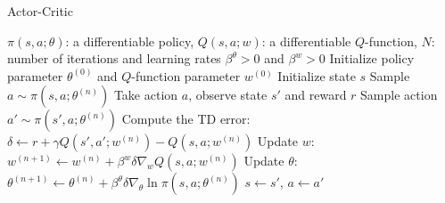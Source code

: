\begin{algorithm}[htb!]
\caption{Actor-Critic}
\label{Codes:ActorCritic}
\begin{algorithmic}
\REQUIRE $\pi(s, a; \theta)$: a differentiable policy, $Q(s, a; w)$: a differentiable $Q$-function, $N$: number of iterations and learning rates $\beta^\theta > 0$ and $\beta^w > 0$
\STATE Initialize policy parameter $\theta^{(0)}$ and $Q$-function parameter $w^{(0)}$
\STATE Initialize state $s$
    \STATE Sample $a \sim \pi(s, a; \theta^{(n)})$
    \STATE Take action $a$, observe state $s'$ and reward $r$
    \STATE Sample action $a' \sim \pi(s', a; \theta^{(n)})$
    \STATE Compute the TD error: $\delta \gets r + \gamma Q(s', a'; w^{(n)}) - Q(s, a; w^{(n)})$
    \STATE Update $w$: $w^{(n+1)} \gets w^{(n)} + \beta^w \delta \nabla_w Q(s, a; w^{(n)})$
    \STATE Update $\theta$: $\theta^{(n+1)} \gets \theta^{(n)} + \beta^\theta \delta \nabla_\theta \ln \pi(s, a; \theta^{(n)})$
    \STATE $s \gets s'$, $a \gets a'$
\ENDFOR
\end{algorithmic}
\end{algorithm}
